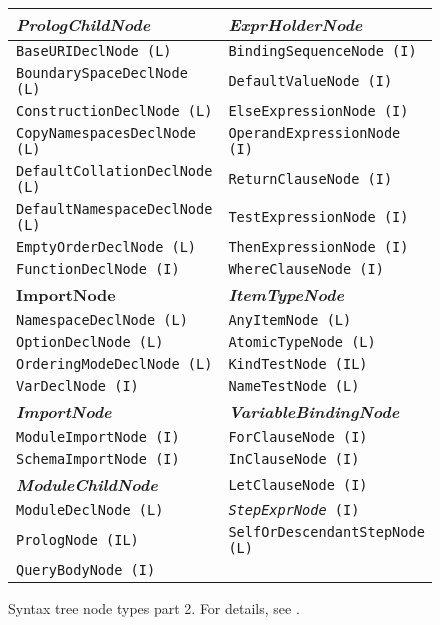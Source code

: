\begin{figure}
\caption{Syntax tree node types part 2. For details, see \cite{thesis_schejbal}.}
\label{FIG_syntax_tree_node_types_part_2}
\begin{tabular}{l | l}
\textbf{\emph{PrologChildNode}} & \textbf{\emph{ExprHolderNode}} \\
\hline
\texttt{BaseURIDeclNode (L)} & \texttt{BindingSequenceNode (I)} \\
\texttt{BoundarySpaceDeclNode (L)} & \texttt{DefaultValueNode (I)} \\
\texttt{ConstructionDeclNode (L)} & \texttt{ElseExpressionNode (I)} \\
\texttt{CopyNamespacesDeclNode (L)} & \texttt{OperandExpressionNode (I)} \\
\texttt{DefaultCollationDeclNode (L)} & \texttt{ReturnClauseNode (I)} \\
\texttt{DefaultNamespaceDeclNode (L)} & \texttt{TestExpressionNode (I)} \\
\texttt{EmptyOrderDeclNode (L)} & \texttt{ThenExpressionNode (I)} \\
\texttt{FunctionDeclNode (I)} & \texttt{WhereClauseNode (I)} \\
\cline{2-2} \textbf{ImportNode} & \textbf{\emph{ItemTypeNode}} \\
\cline{2-2} \texttt{NamespaceDeclNode (L)} & \texttt{AnyItemNode (L)} \\
\texttt{OptionDeclNode (L)} & \texttt{AtomicTypeNode (L)} \\
\texttt{OrderingModeDeclNode (L)} & \texttt{KindTestNode (IL)} \\
\texttt{VarDeclNode (I)} & \texttt{NameTestNode (L)} \\
\cline{1-2} \textbf{\emph{ImportNode}} & \textbf{\emph{VariableBindingNode}} \\
\cline{1-2} \texttt{ModuleImportNode (I)} & \texttt{ForClauseNode (I)} \\
\texttt{SchemaImportNode (I)} & \texttt{InClauseNode (I)} \\
\cline{1-1} \textbf{\emph{ModuleChildNode}} & \texttt{LetClauseNode (I)} \\
\cline{1-2} \texttt{ModuleDeclNode (L)} & \texttt{\emph{StepExprNode} (I)} \\
\cline{2-2} \texttt{PrologNode (IL)} & \texttt{SelfOrDescendantStepNode (L)} \\
\texttt{QueryBodyNode (I)} & 
\end{tabular}
\end{figure}

